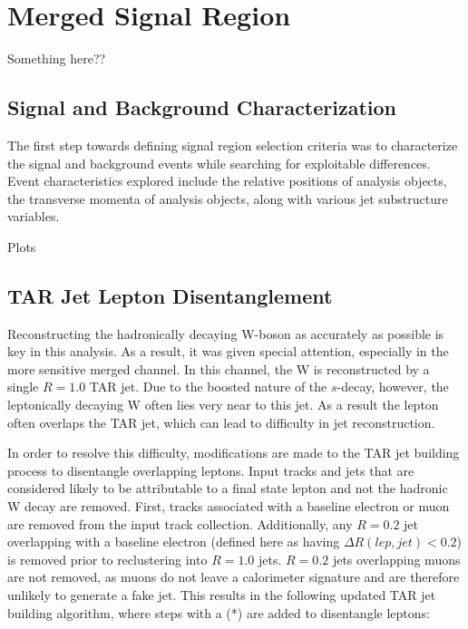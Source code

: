\section{Merged Signal Region}
Something here??
\label{section:sr_merged}
\subsection{Signal and Background Characterization}
The first step towards defining signal region selection criteria was to characterize the signal and background events while searching for exploitable differences. Event characteristics explored include the relative positions of analysis objects, the transverse momenta of analysis objects, along with various jet substructure variables.

Plots

\subsection{TAR Jet Lepton Disentanglement}
Reconstructing the hadronically decaying W-boson as accurately as possible is key in this analysis. As a result, it was given special attention, especially in the more sensitive merged channel. In this channel, the W is reconstructed by a single $R=1.0$ TAR jet. Due to the boosted nature of the $s$-decay, however, the leptonically decaying W often lies very near to this jet. As a result the lepton often overlaps the TAR jet, which can lead to difficulty in jet reconstruction.

In order to resolve this difficulty, modifications are made to the TAR jet building process to disentangle overlapping leptons. Input tracks and jets that are considered likely to be attributable to a final state lepton and not the hadronic W decay are removed. First, tracks associated with a baseline electron or muon are removed from the input track collection. Additionally, any \akt $R=0.2$ jet overlapping with a baseline electron (defined here as having $\Delta R(lep,jet) < 0.2$) is removed prior to reclustering into $R=1.0$ jets. $R=0.2$ jets overlapping muons are not removed, as muons do not leave a calorimeter signature and are therefore unlikely to generate a fake jet. This results in the following updated TAR jet building algorithm, where steps with a (*) are added to disentangle leptons:

